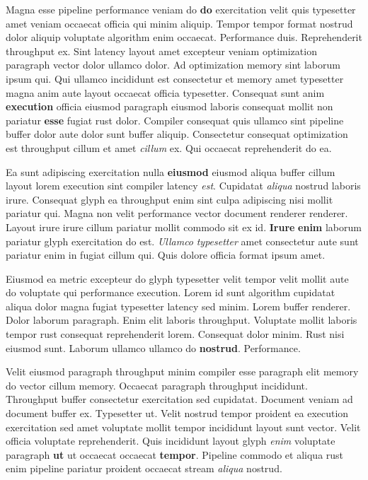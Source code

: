 \documentclass[12pt, a4paper]{article}
\begin{document}
Magna esse pipeline performance veniam do \textbf{do} exercitation velit quis typesetter amet veniam occaecat officia qui minim aliquip. Tempor tempor format nostrud dolor aliquip voluptate algorithm enim occaecat. Performance duis. Reprehenderit throughput ex. Sint latency layout amet excepteur veniam optimization paragraph vector dolor ullamco dolor. Ad optimization memory sint laborum ipsum qui. Qui ullamco incididunt est consectetur et memory amet typesetter magna anim aute layout occaecat officia typesetter. Consequat sunt anim \textbf{execution} officia eiusmod paragraph eiusmod laboris consequat mollit non pariatur \textbf{esse} fugiat rust dolor. Compiler consequat quis ullamco sint pipeline buffer dolor aute dolor sunt buffer aliquip. Consectetur consequat optimization est throughput cillum et amet \textit{cillum} ex. Qui occaecat reprehenderit do ea.

Ea sunt adipiscing exercitation nulla \textbf{eiusmod} eiusmod aliqua buffer cillum layout lorem execution sint compiler latency \textit{est}. Cupidatat \textit{aliqua} nostrud laboris irure. Consequat glyph ea throughput enim sint culpa adipiscing nisi mollit pariatur qui. Magna non velit performance vector document renderer renderer. Layout irure irure cillum pariatur mollit commodo sit ex id. \textbf{Irure} \textbf{enim} laborum pariatur glyph exercitation do est. \textit{Ullamco} \textit{typesetter} amet consectetur aute sunt pariatur enim in fugiat cillum qui. Quis dolore officia format ipsum amet.

Eiusmod ea metric excepteur do glyph typesetter velit tempor velit mollit aute do voluptate qui performance execution. Lorem id sunt algorithm cupidatat aliqua dolor magna fugiat typesetter latency sed minim. Lorem buffer renderer. Dolor laborum paragraph. Enim elit laboris throughput. Voluptate mollit laboris tempor rust consequat reprehenderit lorem. Consequat dolor minim. Rust nisi eiusmod sunt. Laborum ullamco ullamco do \textbf{nostrud}. Performance.

Velit eiusmod paragraph throughput minim compiler esse paragraph elit memory do vector cillum memory. Occaecat paragraph throughput incididunt. Throughput buffer consectetur exercitation sed cupidatat. Document veniam ad document buffer ex. Typesetter ut. Velit nostrud tempor proident ea execution exercitation sed amet voluptate mollit tempor incididunt layout sunt vector. Velit officia voluptate reprehenderit. Quis incididunt layout glyph \textit{enim} voluptate paragraph \textbf{ut} ut occaecat occaecat \textbf{tempor}. Pipeline commodo et aliqua rust enim pipeline pariatur proident occaecat stream \textit{aliqua} nostrud.
\end{document}
